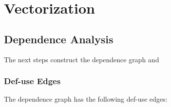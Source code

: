 
\section{Vectorization}
\label{sec:vectorization}


\subsection{Dependence Analysis}
\label{sec:dependence}

The next steps construct the dependence graph and 

\subsubsection{Def-use Edges}

The dependence graph has the following def-use edges:

